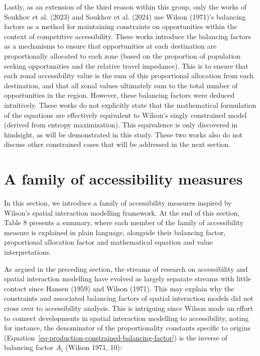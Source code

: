 \documentclass[
]{article}
\begin{document}
Lastly, as an extension of the third reason within this group, only the
works of Soukhov et al. (2023) and Soukhov et al. (2024) use Wilson
(1971)'s balancing factors as a method for maintaining constraints on
opportunities within the context of competitive accessibility. These
works introduce the balancing factors as a mechanisms to ensure that
opportunities at each destination are proportionally allocated to each
zone (based on the proportion of population seeking opportunities and
the relative travel impedance). This is to ensure that each zonal
accessibility value is the sum of this proportional allocation from each
destination, and that all zonal values ultimately sum to the total
number of opportunities in the region. However, these balancing factors
were deduced intuitively. These works do not explicitly state that the
mathematical formulation of the equations are effectively equivalent to
Wilson's singly constrained model (derived from entropy maximization).
This equivalence is only discovered in hindsight, as will be
demonstrated in this study. These two works also do not discuss other
constrained cases that will be addressed in the next section.

\section{A family of accessibility
measures}\label{a-family-of-accessibility-measures}

In this section, we introduce a family of accessibility measures
inspired by Wilson's spatial interaction modelling framework. At the end
of this section, Table 8 presents a summary, where each member of the
family of accessibility measure is explained in plain language,
alongside their balancing factor, proportional allocation factor and
mathematical equation and value interpretations.

As argued in the preceding section, the streams of research on
accessibility and spatial interaction modelling have evolved as largely
separate streams with little contact since Hansen (1959) and Wilson
(1971). This may explain why the constraints and associated balancing
factors of spatial interaction models did not cross over to
accessibility analysis. This is intriguing since Wilson made an effort
to connect developments in spatial interaction modelling to
accessibility, noting for instance, the denominator of the
proportionality constants specific to origins
(Equation~\ref{eq-production-constrained-balancing-factor}) is the
inverse of balancing factor \(A_i\) (Wilson 1971, 10):
\end{document}
